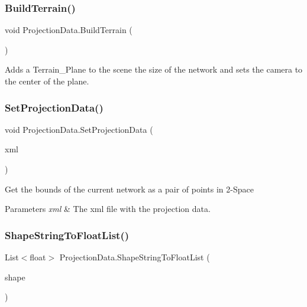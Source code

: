 \subsubsection{\texorpdfstring{BuildTerrain()}{BuildTerrain()}}
{\footnotesize\ttfamily void Projection\+Data.\+Build\+Terrain (\begin{DoxyParamCaption}{ }\end{DoxyParamCaption})}



Adds a Terrain\+\_\+\+Plane to the scene the size of the network and sets the camera to the center of the plane. 

\mbox{\label{class_projection_data_aa1a7f30d0e2d0dd4a964581d6307e3bb}} 
\subsubsection{\texorpdfstring{SetProjectionData()}{SetProjectionData()}}
{\footnotesize\ttfamily void Projection\+Data.\+Set\+Projection\+Data (\begin{DoxyParamCaption}\item[{Xml\+Document}]{xml }\end{DoxyParamCaption})}



Get the bounds of the current network as a pair of points in 2-\/Space 


\begin{DoxyParams}{Parameters}
{\em xml} & The xml file with the projection data.\\
\hline
\end{DoxyParams}
\mbox{\label{class_projection_data_a9ff12ad53d0ef919479b5cc7168ac59c}} 
\subsubsection{\texorpdfstring{ShapeStringToFloatList()}{ShapeStringToFloatList()}}
{\footnotesize\ttfamily List$<$float$>$ Projection\+Data.\+Shape\+String\+To\+Float\+List (\begin{DoxyParamCaption}\item[{string}]{shape }\end{DoxyParamCaption})}



